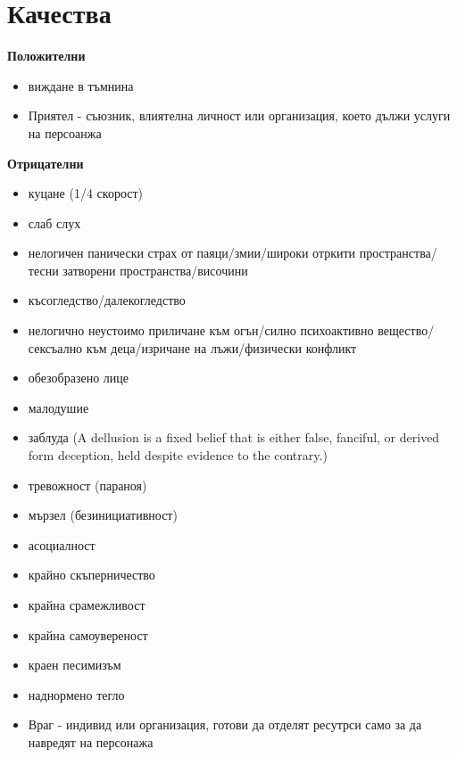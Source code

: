 \section{Качества}

\textbf{Положителни}
\begin{itemize}
\item{виждане в тъмнина}
\item{Приятел - съюзник, влиятелна личност или организация, което дължи услуги на персоанжа}
\end{itemize}

\vspace{0.7cm}
\textbf{Отрицателни}
\begin{itemize}
\item{куцане (1/4 скорост)}
\item{слаб слух}
\item{нелогичен панически страх от паяци/змии/широки отркити пространства/тесни затворени пространства/височини}
\item{късогледство/далекогледство}
\item{нелогично неустоимо приличане към огън/силно психоактивно вещество/сексъално към деца/изричане на лъжи/физически конфликт}
\item{обезобразено лице}
\item{малодушие}
\item{заблуда (A dellusion is a fixed belief that is either false, fanciful, or derived form deception, held despite evidence to the contrary.)}
\item{тревожност (параноя)}
\item{мързел (безинициативност)}
\item{асоциалност}
\item{крайно скъперничество}
\item{крайна срамежливост}
\item{крайна самоувереност}
\item{краен песимизъм}
\item{наднормено тегло}
\item{Враг - индивид или организация, готови да отделят ресутрси само за да навредят на персонажа}
\end{itemize}


